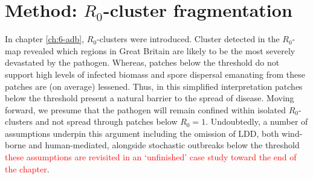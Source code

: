 
\section{Method: $R_0$-cluster fragmentation}

In chapter \ref{ch:6-adb}, $R_0$-clusters were introduced.
Cluster detected in the $R_0$-map revealed which regions in Great Britain are likely to be the most severely devastated by the pathogen.
Whereas, patches below the threshold do not support high levels of infected biomass and spore dispersal emanating from these patches are (on average) lessened.
Thus, in this simplified interpretation patches below the threshold present a natural barrier to the spread of disease.
Moving forward, we presume that the pathogen will remain confined within isolated $R_0$-clusters and not spread through patches below $R_0=1$.
Undoubtedly, a number of assumptions underpin this argument including the omission of LDD, both wind-borne and human-mediated, alongside stochastic outbreaks below the threshold\textemdash 
\textcolor{red}{these assumptions are revisited in an `unfinished' case study toward the end of the chapter}.
 
